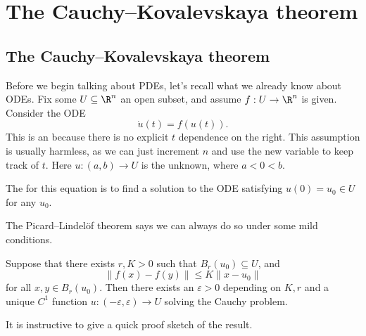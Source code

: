 \documentclass[a4paper]{article}
\begin{document}
\section{The Cauchy--Kovalevskaya theorem}

\subsection{The Cauchy--Kovalevskaya theorem}
Before we begin talking about PDEs, let's recall what we already know about ODEs. Fix some $U \subseteq \R^n$ an open subset, and assume $f: U \to \R^n$ is given. Consider the ODE
\[
  \dot{u}(t) = f(u(t)).
\]
This is an  because there is no explicit $t$ dependence on the right. This assumption is usually harmless, as we can just increment $n$ and use the new variable to keep track of $t$. Here $u: (a, b) \to U$ is the unknown, where $a < 0 < b$.

The  for this equation is to find a solution to the ODE satisfying $u(0) = u_0 \in U$ for any $u_0$.

The Picard--Lindel\"of theorem says we can always do so under some mild conditions.
\begin{thm}
  Suppose that there exists $r, K > 0$ such that $B_r(u_0) \subseteq U$, and
  \[
    \|f(x) - f(y)\| \leq K \|x - u_0\|
  \]
  for all $x, y \in B_r(u_0)$. Then there exists an $\varepsilon > 0$ depending on $K, r$ and a unique $C^1$ function $u: (-\varepsilon, \varepsilon) \to U$ solving the Cauchy problem.
\end{thm}

It is instructive to give a quick proof sketch of the result.
\end{document}
